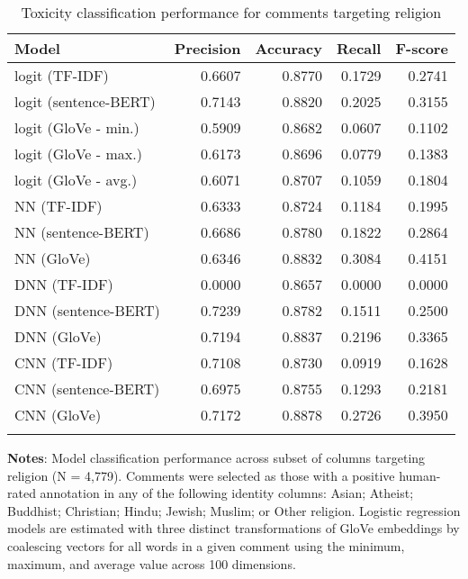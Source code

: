 \begin{table}[h]
	\caption{Toxicity classification performance for comments targeting religion \label{table:performance-religion}}
    \centering
	\begin{tabular}{lrrrr}
		\toprule
			Model &  Precision &  Accuracy &  Recall &  F-score \\
		\midrule
			\addlinespace{}
			\parbox{7.5cm}{logit (TF-IDF)} &    0.6607 &    0.8770 &  0.1729 &   0.2741 \\
			\addlinespace{}
			logit (sentence-BERT) &     0.7143 &    0.8820 &  0.2025 &   0.3155 \\
			\addlinespace{}
			logit (GloVe - min.) &     0.5909 &    0.8682 &  0.0607 &   0.1102 \\
			\addlinespace{}
			logit (GloVe - max.) &     0.6173 &    0.8696 &  0.0779 &   0.1383 \\
			\addlinespace{}
			logit (GloVe - avg.) &     0.6071 &    0.8707 &  0.1059 &   0.1804 \\
			\addlinespace{}
			NN (TF-IDF) &     0.6333 &    0.8724 &  0.1184 &   0.1995 \\
			\addlinespace{}
			NN (sentence-BERT) &     0.6686 &    0.8780 &  0.1822 &   0.2864 \\
			\addlinespace{}
			NN (GloVe) &     0.6346 &    0.8832 &  0.3084 &   0.4151 \\
			\addlinespace{}
			DNN (TF-IDF) &     0.0000 &    0.8657 &  0.0000 &   0.0000 \\
			\addlinespace{}
			DNN (sentence-BERT) &     0.7239 &    0.8782 &  0.1511 &   0.2500 \\
			\addlinespace{}
			DNN (GloVe) &     0.7194 &    0.8837 &  0.2196 &   0.3365 \\
			\addlinespace{}
			CNN (TF-IDF) &      0.7108 &    0.8730 &  0.0919 &   0.1628 \\
			\addlinespace{}
			CNN (sentence-BERT)  &     0.6975 &    0.8755 &  0.1293 &   0.2181 \\
			\addlinespace{}
			CNN (GloVe)  &     0.7172 &    0.8878 &  0.2726 &   0.3950 \\
	\bottomrule
	\addlinespace[1em]
	\end{tabular}
	\parbox{14.5cm}{\textbf{Notes}: Model classification performance across subset of columns targeting religion (N = 4,779). Comments were selected as those with a positive human-rated annotation in any of the following identity columns: Asian; Atheist; Buddhist; Christian; Hindu; Jewish; Muslim; or Other religion. Logistic regression models are estimated with three distinct transformations of GloVe embeddings by coalescing vectors for all words in a given comment using the minimum, maximum, and average value across 100 dimensions.}
\end{table}


